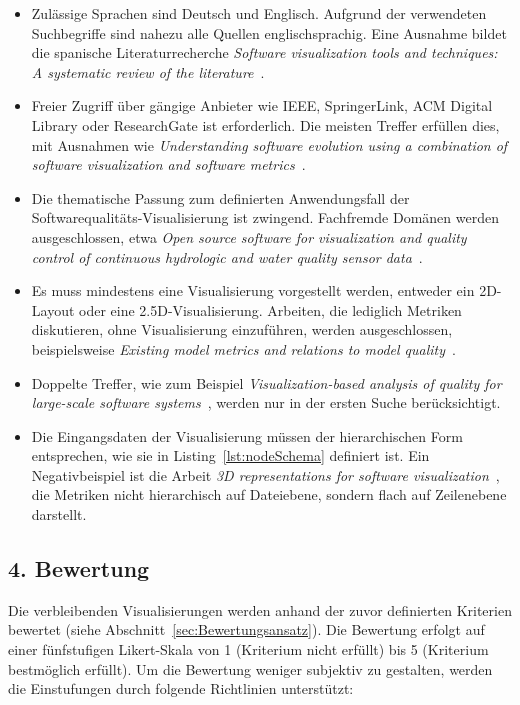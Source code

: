 \begin{itemize}
    \item Zulässige Sprachen sind Deutsch und Englisch. Aufgrund der verwendeten Suchbegriffe sind nahezu alle Quellen englischsprachig. Eine Ausnahme bildet die spanische Literaturrecherche \textit{Software visualization tools and techniques: A systematic review of the literature}~\cite{cruz2016software}.
    \item Freier Zugriff über gängige Anbieter wie IEEE, SpringerLink, ACM Digital Library oder ResearchGate ist erforderlich. Die meisten Treffer erfüllen dies, mit Ausnahmen wie \textit{Understanding software evolution using a combination of software visualization and software metrics}~\cite{lanza2002understanding}.
    \item Die thematische Passung zum definierten Anwendungsfall der Softwarequalitäts-Visualisierung ist zwingend. Fachfremde Domänen werden ausgeschlossen, etwa \textit{Open source software for visualization and quality control of continuous hydrologic and water quality sensor data}~\cite{horsburgh2015open}.
    \item Es muss mindestens eine Visualisierung vorgestellt werden, entweder ein 2D-Layout oder eine 2{.}5D-Visualisierung. Arbeiten, die lediglich Metriken diskutieren, ohne Visualisierung einzuführen, werden ausgeschlossen, beispielsweise \textit{Existing model metrics and relations to model quality}~\cite{mohagheghi2009existing}.
    \item Doppelte Treffer, wie zum Beispiel \textit{Visualization-based analysis of quality for large-scale software systems}~\cite{visbasedlarge}, werden nur in der ersten Suche berücksichtigt.
    \item Die Eingangsdaten der Visualisierung müssen der hierarchischen Form entsprechen, wie sie in Listing~\ref{lst:nodeSchema} definiert ist. Ein Negativbeispiel ist die Arbeit \textit{3D representations for software visualization}~\cite{3dsoftwareMarcus}, die Metriken nicht hierarchisch auf Dateiebene, sondern flach auf Zeilenebene darstellt.
\end{itemize}

\subsection*{4. Bewertung} \label{sec:MethodikAuswertung}

Die verbleibenden Visualisierungen werden anhand der zuvor definierten Kriterien bewertet (siehe Abschnitt~\ref{sec:Bewertungsansatz}). Die Bewertung erfolgt auf einer fünfstufigen Likert-Skala von 1 (Kriterium nicht erfüllt) bis 5 (Kriterium bestmöglich erfüllt). Um die Bewertung weniger subjektiv zu gestalten, werden die Einstufungen durch folgende Richtlinien unterstützt:

